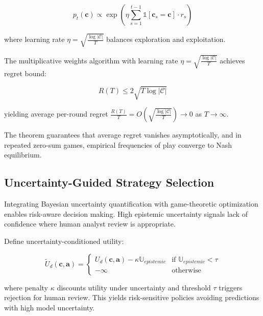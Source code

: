 \begin{equation}
p_t(\mathbf{c}) \propto \exp\left(\eta \sum_{s=1}^{t-1} \mathbb{1}[\mathbf{c}_s = \mathbf{c}] \cdot r_s\right)
\end{equation}

where learning rate $\eta = \sqrt{\frac{\log |\mathcal{C}|}{T}}$ balances exploration and exploitation.

\begin{theorem}
\label{thm:regret_bound}
The multiplicative weights algorithm with learning rate $\eta = \sqrt{\frac{\log |\mathcal{C}|}{T}}$ achieves regret bound:

\begin{equation}
R(T) \leq 2\sqrt{T \log |\mathcal{C}|}
\end{equation}

yielding average per-round regret $\frac{R(T)}{T} = O\left(\sqrt{\frac{\log |\mathcal{C}|}{T}}\right) \to 0$ as $T \to \infty$.
\end{theorem}

The theorem guarantees that average regret vanishes asymptotically, and in repeated zero-sum games, empirical frequencies of play converge to Nash equilibrium.

\subsection{Uncertainty-Guided Strategy Selection}

Integrating Bayesian uncertainty quantification with game-theoretic optimization enables risk-aware decision making. High epistemic uncertainty signals lack of confidence where human analyst review is appropriate.

Define uncertainty-conditioned utility:

\begin{equation}
\tilde{U}_d(\mathbf{c}, \mathbf{a}) = \begin{cases}
U_d(\mathbf{c}, \mathbf{a}) - \kappa \mathbb{U}_{epistemic} & \text{if } \mathbb{U}_{epistemic} < \tau \\
-\infty & \text{otherwise}
\end{cases}
\end{equation}

where penalty $\kappa$ discounts utility under uncertainty and threshold $\tau$ triggers rejection for human review. This yields risk-sensitive policies avoiding predictions with high model uncertainty.

